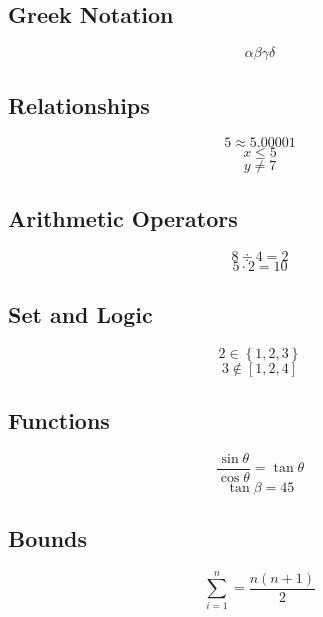 \documentclass{article}
\begin{document}
\subsection{Greek Notation}
$$\alpha \beta \gamma \delta$$
\subsection{Relationships}
$$5\approx 5.00001$$
$$x\le 5$$
$$y\ne 7$$
\subsection{Arithmetic Operators}
$$8\div 4=2$$
$$5\cdot 2=10$$
\subsection{Set and Logic}
$$2\in \left\{1, 2, 3\right\}$$
$$3\notin \left[1, 2, 4\right]$$
\subsection{Functions}
$$\frac{\sin{\theta}}{\cos{\theta}}=\tan{\theta}$$
$$\tan {\beta}=45$$
\subsection{Bounds}
$$\overset{n}{\underset{i=1}{\sum}}=\frac{n\left(n+1\right)}{2}$$
\end{document}
